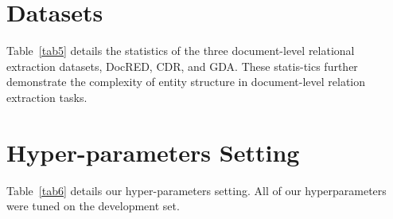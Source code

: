 \documentclass[11pt]{article}
\begin{document}
\begin{table*}[]
\centering
{}
\caption{\label{tab6} Hyper-parameters Setting.}
\end{table*}

\appendix
\newpage
\section{Datasets}
\label{appendix-a}
Table~\ref{tab5} details the statistics of the three document-level relational extraction datasets, DocRED, CDR, and GDA. These statis-tics further demonstrate the complexity of entity structure in document-level relation extraction tasks.


\section{Hyper-parameters Setting}
\label{appendix-b}
Table~\ref{tab6} details our hyper-parameters setting. All of our hyperparameters were tuned on the development set.
\end{document}
